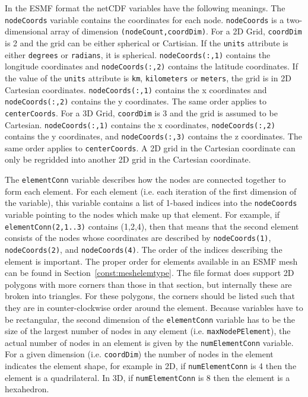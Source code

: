  In the ESMF format the netCDF variables have the following meanings. The {\tt nodeCoords} variable contains the coordinates for each node.
 {\tt nodeCoords} is a two-dimensional array of dimension {\tt (nodeCount,coordDim)}.
 For a 2D Grid, {\tt coordDim} is 2 and the grid can be either spherical or Cartisian. If the {\tt units}
 attribute is either {\tt degrees} or {\tt radians}, it is spherical. {\tt nodeCoords(:,1)} contains 
the longitude coordinates and {\tt nodeCoords(:,2)} contains the latitude coordinates.  If the value of 
the {\tt units} attribute is {\tt km}, {\tt kilometers} or {\tt meters}, the grid is in 2D Cartesian 
coordinates. {\tt nodeCoords(:,1)} contains the x coordinates and
 {\tt nodeCoords(:,2)} contains the y coordinates.
 The same order applies to {\tt centerCoords}.
 For a 3D Grid, {\tt coordDim} is 3 and the grid is assumed to be Cartesian. {\tt nodeCoords(:,1)} contains the x coordinates, {\tt nodeCoords(:,2)} contains the y coordinates, 
 and {\tt nodeCoords(:,3)} contains the z coordinates.  The same order applies to {\tt centerCoords}.
A 2D grid in the Cartesian coordinate can only be regridded into another 2D grid in the Cartesian coordinate.
 
 The {\tt elementConn} variable describes how the nodes are connected together to form each element. For each element (i.e. each iteration of the first
 dimension of the variable), this variable contains a list of 1-based indices into the {\tt nodeCoords} variable pointing to the nodes which make up that
 element. For example, if {\tt elementConn(2,1..3)} contains (1,2,4), then that means that the second element consists of the nodes whose coordinates are
 described by {\tt nodeCoords(1)}, {\tt nodeCoords(2)}, and {\tt nodeCoords(4)}. The order of the indices describing the element is important.
 The proper order for elements available in an ESMF mesh can be found in Section~\ref{const:meshelemtype}. The file format does support 2D polygons with more
 corners than those in that section, but internally these are broken into triangles. For these polygons, the corners should
 be listed such that they are in counter-clockwise order around the element.  Because variables have to be rectangular, the second
 dimension of the {\tt elementConn} variable has to be the size of the largest number of nodes in any element (i.e. {\tt maxNodePElement}), the actual number of
 nodes in an element is given by the {\tt numElementConn} variable. For a given dimension (i.e. {\tt coordDim}) the number of nodes in the element
 indicates the element shape, for example in 2D, if {\tt numElementConn} is 4 then the element is a quadrilateral. In 3D, if {\tt numElementConn} is 8
 then the element is a hexahedron.

